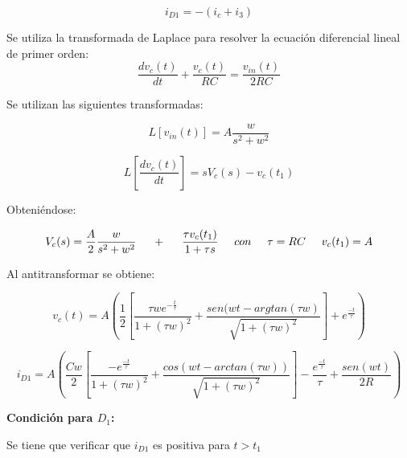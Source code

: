 \begin{equation*}
	i_{D1} = - \left( i_c + i_3 \right)
\end{equation*}

Se utiliza la transformada de Laplace para resolver la ecuación diferencial lineal de primer orden:
\begin{equation}
\frac{dv_c(t)}{dt}+\frac{v_c(t)}{RC}=\frac{v_{in}(t)}{2RC}
\end{equation}

Se utilizan las siguientes transformadas:

\begin{equation*}
	L\left[ v_{in}(t) \right] = A\frac{w}{s^2 + w^2}
\end{equation*}


\begin{equation*}
	L \left[ \frac{dv_c(t)}{dt} \right] = sV_c(s)-v_c(t_1)
\end{equation*}

Obteniéndose:

\begin{equation*}
	V_c(s) = \frac{A}{2}\frac{w}{s^2+w^2} \hspace{0.5cm} + \hspace{0.5cm} \frac{\tau v_c(t_1)}{1+\tau s} \hspace{0.5cm} con \hspace{0.5cm} \tau = RC \hspace{0.5cm} v_c(t_1) = A
\end{equation*}


Al antitransformar se obtiene:

\begin{equation*}
	v_c(t) = A\left(\frac{1}{2}\left[ \frac{\tau w e^{-\frac{t}{\tau}}}{1 + (\tau w)^2} + \frac{sen(wt-argtan(\tau w)}{\sqrt{1+(\tau w)^2}}  \right] + e^\frac{-t}{\tau } \right)
\end{equation*}


\begin{equation*}
	i_{D1} = A \left( \frac{Cw}{2} \left[ \frac{- e^\frac{-t}{\tau}}{1+(\tau w)^2} + \frac{cos(wt-arctan(\tau w))}{\sqrt{1+(\tau w)^2}}\right] -\frac{e^\frac{-t}{\tau}}{\tau}+\frac{sen(wt)}{2R}\right)
\end{equation*}





{\large \bf Condición para $D_1$:}


Se tiene que verificar que $i_{D1}$ es positiva para $t>t_1$

